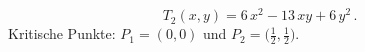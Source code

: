{%
% 
% 
% 
}

{
\[
T_2(x,y) = 6\,x^2 -13\,xy+6\,y^2\,.
\]
Kritische Punkte: $P_1 = (0,0)$ und $P_2 = \big(\frac 12,\frac 12\big)$.
 }

